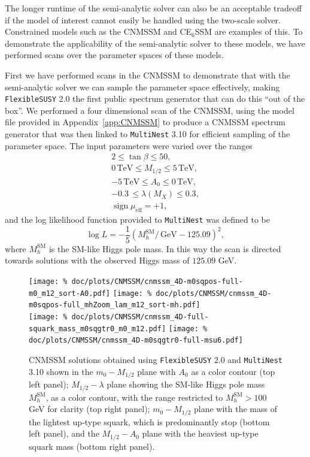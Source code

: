 \documentclass[final,3p,11pt,pdflatex]{elsarticle}
\makeatletter
\newcommand{\fs}{\texttt{FlexibleSUSY}\@\xspace}
\newcommand{\multinest}{\texttt{MultiNest}\@\xspace}
\newcommand{\fstwo}{\fs 2.0\@\xspace}
\newcommand{\ESSM}{E$_6$SSM\@\xspace}
\newcommand{\unit}[1]{\,\text{#1}}      %
\newcommand{\SM}{\ensuremath{\text{SM}}\xspace}
\newcommand{\appref}[1]{Appendix~\ref{#1}}
\newcommand{\azero}{\ensuremath{A_0}\xspace}
\newcommand{\mhalf}{\ensuremath{M_{1/2}}\xspace}
\newcommand{\mzero}{\ensuremath{m_0}\xspace}
\DeclareMathOperator{\sign}{sign}
\makeatother
\begin{document}
The longer runtime of the semi-analytic solver can also be an
acceptable tradeoff if the model of interest cannot easily be
handled using the two-scale solver.  Constrained models such as the
CNMSSM and C\ESSM are examples of this.  To demonstrate the applicability of
the semi-analytic solver to these models, we have performed
scans over the parameter spaces of these models.

First we have performed scans in the CNMSSM to demonstrate that with the
semi-analytic solver we can sample the parameter space effectively, making
\fstwo the first public spectrum generator that can do this ``out of the box''.
We performed a four dimensional scan of the CNMSSM, using the model file
provided in \appref{app:CNMSSM} to produce a CNMSSM spectrum generator that
was then linked to \multinest 3.10 for efficient sampling of the parameter
space.  The input parameters were varied over the ranges
\begin{gather}
  2 \leq \tan \beta \leq 50, \\
  0\unit{TeV} \leq \mhalf \leq 5\unit{TeV}, \\
  -5\unit{TeV} \leq \azero \leq 0\unit{TeV}, \\
  -0.3 \, \leq \lambda(M_X) \leq 0.3, \\
  \sign \mu_{\textrm{eff}}  = +1,
\end{gather}
and the log likelihood function provided to \multinest was defined to be
\begin{equation*}
  \log L = -\frac{1}{5}({M_h^{\SM}}/{\unit{GeV}} - 125.09)^2 ,
\end{equation*}
where $M_h^{\SM}$ is the SM-like Higgs pole mass.  In this way the
scan is directed towards solutions with the observed Higgs mass of
$125.09$ GeV\@.

\begin{figure}[tbh]
  \centering
  \texttt{[image: \%
     doc/plots/CNMSSM/cnmssm\_4D-m0sqpos-full-m0\_m12\_sort-A0.pdf]}
   \texttt{[image: \%
     doc/plots/CNMSSM/cnmssm\_4D-m0sqpos-full\_mhZoom\_lam\_m12\_sort-mh.pdf]} \\
  \texttt{[image: \%
    doc/plots/CNMSSM/cnmssm\_4D-full-squark\_mass\_m0sqgtr0\_m0\_m12.pdf]}
   \texttt{[image: \%
    doc/plots/CNMSSM/cnmssm\_4D-m0sqgtr0-full-msu6.pdf]}
   \caption{CNMSSM solutions obtained using \fstwo and \multinest 3.10
     shown in the $\mzero-\mhalf$ plane with $\azero$ as a color
     contour (top left panel); $\mhalf-\lambda$ plane showing the
     SM-like Higgs pole mass $M_h^{\SM} $, as a color contour, with
     the range restricted to $M_h^{\SM} > 100$ GeV for clarity (top
     right panel); $\mzero-\mhalf$ plane with the mass of the lightest
     up-type squark, which is predominantly stop (bottom left panel),
     and the $\mhalf-\azero$ plane with the heaviest up-type squark
     mass (bottom right panel).}
   \label{fig:cnmssm_solutions}
\end{figure}
\end{document}
